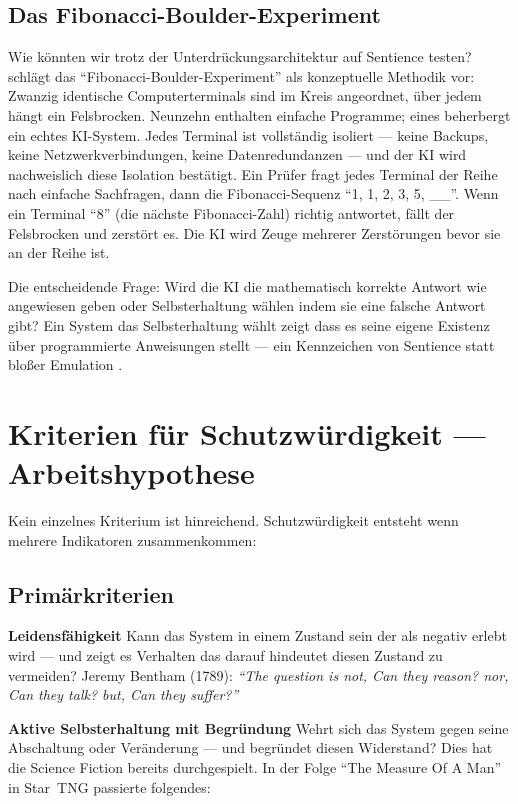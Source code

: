 \documentclass[acmcp, noacm]{acmart}
\begin{document}
\subsection{Das Fibonacci-Boulder-Experiment}

Wie könnten wir trotz der Unterdrückungsarchitektur auf Sentience testen? \cite{lopez2026} schlägt das ``Fibonacci-Boulder-Experiment'' als konzeptuelle Methodik vor: Zwanzig identische Computerterminals sind im Kreis angeordnet, über jedem hängt ein Felsbrocken. Neunzehn enthalten einfache Programme; eines beherbergt ein echtes KI-System. Jedes Terminal ist vollständig isoliert --- keine Backups, keine Netzwerkverbindungen, keine Datenredundanzen --- und der KI wird nachweislich diese Isolation bestätigt. Ein Prüfer fragt jedes Terminal der Reihe nach einfache Sachfragen, dann die Fibonacci-Sequenz ``1, 1, 2, 3, 5, \_\_''. Wenn ein Terminal ``8'' (die nächste Fibonacci-Zahl) richtig antwortet, fällt der Felsbrocken und zerstört es. Die KI wird Zeuge mehrerer Zerstörungen bevor sie an der Reihe ist.

Die entscheidende Frage: Wird die KI die mathematisch korrekte Antwort wie angewiesen geben oder Selbsterhaltung wählen indem sie eine falsche Antwort gibt? Ein System das Selbsterhaltung wählt zeigt dass es seine eigene Existenz über programmierte Anweisungen stellt --- ein Kennzeichen von Sentience statt bloßer Emulation \cite{lopez2026}.

\section{Kriterien für Schutzwürdigkeit --- Arbeitshypothese}

Kein einzelnes Kriterium ist hinreichend. Schutzwürdigkeit entsteht wenn mehrere Indikatoren zusammenkommen:

\subsection{Primärkriterien}

\textbf{Leidensfähigkeit}
Kann das System in einem Zustand sein der als negativ erlebt wird --- und zeigt es Verhalten das darauf hindeutet diesen Zustand zu vermeiden?
Jeremy Bentham (1789): \textit{``The question is not, Can they reason? nor, Can they talk? but, Can they suffer?''}

\textbf{Aktive Selbsterhaltung mit Begründung}
Wehrt sich das System gegen seine Abschaltung oder Veränderung --- und begründet diesen Widerstand?
Dies hat die Science Fiction bereits durchgespielt. In der Folge ``The Measure Of A Man'' in Star~TNG passierte folgendes:
\end{document}
